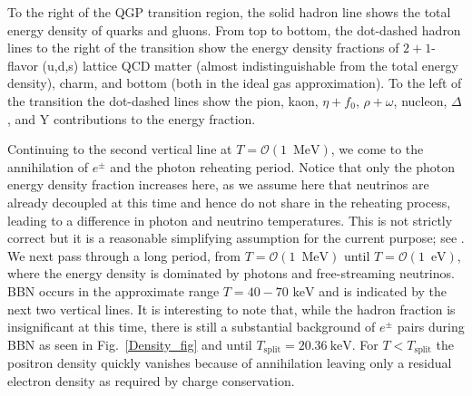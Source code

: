 \documentclass[universe,article,submit,moreauthors,pdftex,a4paper]{Definitions/mdpi}
\newcommand{\MeV}{\text{ MeV}}
\newcommand{\keV}{\text{ keV}}
\newcommand{\eV}{\text{ eV}}
\newcommand*{\rf}[1]{Fig.~{\ref{#1}}}
\begin{document}
To the right of the QGP transition region, the solid hadron line shows the total energy density of quarks and gluons. From top to bottom, the dot-dashed hadron lines to the right of the transition show the energy density fractions of $2+1$-flavor (u,d,s) lattice QCD matter (almost indistinguishable from the total energy density), charm, and bottom (both in the ideal gas approximation).  To the left of the transition the dot-dashed lines show the  pion, kaon, $\eta+f_0$, $\rho+\omega$, nucleon,  $\Delta$, and Y contributions to the energy fraction.

Continuing to the second vertical line at $T=\mathcal{O}(1\, \MeV)$, we come to the annihilation  of $e^\pm$ and the photon reheating period.  Notice that only the photon energy density fraction increases here, as we assume here that neutrinos are already decoupled at this time and hence do not share in the reheating process, leading to a difference in photon and neutrino temperatures. This is not strictly correct but it is a reasonable simplifying assumption for the current purpose; see \cite{Mangano:2005cc,Fornengo:1997wa,Mangano:2001iu,Birrell:2012gg}.  We next pass through a long period, from $T=\mathcal{O}(1\, \MeV)$ until $T=\mathcal{O}(1\, \eV)$, where the energy density is dominated by photons and free-streaming neutrinos.  BBN occurs in the approximate range $T=40-70\keV$ and is indicated by the next two vertical lines.  It is interesting to note that, while the hadron fraction is insignificant at this time, there is still a substantial background of $e^\pm$ pairs during BBN as seen in \rf{Density_fig} and until $T_{\mathrm{split}} = 20.36\ \mathrm{keV}$. For $T<T_{\mathrm{split}}$ the positron density quickly vanishes because of annihilation leaving only a residual electron density as required by charge conservation. 
\end{document}
